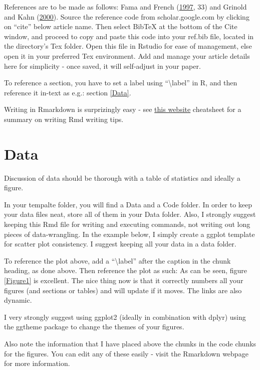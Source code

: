 \documentclass[11pt,preprint, authoryear]{elsarticle}
\numberwithin{equation}{section}
\numberwithin{figure}{section}
\numberwithin{table}{section}
\begin{document}
References are to be made as follows: Fama and French
(\protect\hyperlink{ref-fama1997}{1997}, 33) and Grinold and Kahn
(\protect\hyperlink{ref-grinold2000}{2000}). Source the reference code
from scholar.google.com by clicking on ``cite'' below article name. Then
select BibTeX at the bottom of the Cite window, and proceed to copy and
paste this code into your ref.bib file, located in the directory's Tex
folder. Open this file in Rstudio for ease of management, else open it
in your preferred Tex environment. Add and manage your article details
here for simplicity - once saved, it will self-adjust in your paper.

To reference a section, you have to set a label using
``\textbackslash{}label'' in R, and then reference it in-text as e.g.:
section \ref{Data}.

Writing in Rmarkdown is surprizingly easy - see
\href{https://www.rstudio.com/wp-content/uploads/2015/03/rmarkdown-reference.pdf}{this
website} cheatsheet for a summary on writing Rmd writing tips.

\section{\texorpdfstring{Data \label{Data}}{Data }}\label{data}

Discussion of data should be thorough with a table of statistics and
ideally a figure.

In your tempalte folder, you will find a Data and a Code folder. In
order to keep your data files neat, store all of them in your Data
folder. Also, I strongly suggest keeping this Rmd file for writing and
executing commands, not writing out long pieces of data-wrangling. In
the example below, I simply create a ggplot template for scatter plot
consistency. I suggest keeping all your data in a data folder.

To reference the plot above, add a ``\textbackslash{}label'' after the
caption in the chunk heading, as done above. Then reference the plot as
such: As can be seen, figure \ref{Figure1} is excellent. The nice thing
now is that it correctly numbers all your figures (and sections or
tables) and will update if it moves. The links are also dynamic.

I very strongly suggest using ggplot2 (ideally in combination with
dplyr) using the ggtheme package to change the themes of your figures.

Also note the information that I have placed above the chunks in the
code chunks for the figures. You can edit any of these easily - visit
the Rmarkdown webpage for more information.
\end{document}
